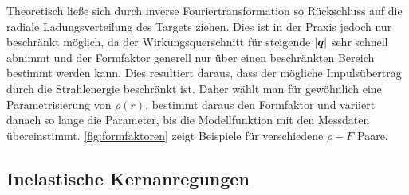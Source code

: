 Theoretisch ließe sich durch inverse Fouriertransformation so Rückschluss auf die radiale Ladungsverteilung des Targets ziehen.
Dies ist in der Praxis jedoch nur beschränkt möglich, da der Wirkungsquerschnitt für steigende $|\boldsymbol{q}|$ sehr schnell abnimmt und der Formfaktor generell nur über einen beschränkten Bereich bestimmt werden kann.
Dies resultiert daraus, dass der mögliche Impulsübertrag durch die Strahlenergie beschränkt ist.
Daher wählt man für gewöhnlich eine Parametrisierung von $\rho(r)$, bestimmt daraus den Formfaktor und variiert danach so lange die Parameter, bis die Modellfunktion mit den Messdaten übereinstimmt.
\autoref{fig:formfaktoren} zeigt Beispiele für verschiedene $\rho-F$ Paare.

\subsection{Inelastische Kernanregungen}
